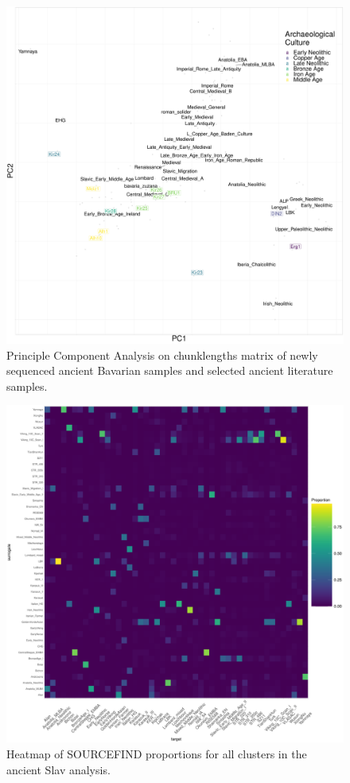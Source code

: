 \begin{figure}[htp]
    \centering
    \includegraphics[width=1.0\textwidth]{../images/appendix/chromopainter_PCA_ancients_Bavaria.pdf}
    \caption{Principle Component Analysis on chunklengths matrix of newly sequenced ancient Bavarian samples and selected ancient literature samples.}
    \label{fig:chromopainter_PCA_ancients_Bavaria}
\end{figure}

\begin{figure}[htp]
    \centering
    \includegraphics[width=1.0\textwidth]{../images/appendix/SF_heatmap_slavs.pdf}
    \caption{Heatmap of SOURCEFIND proportions for all clusters in the ancient Slav analysis.}
    \label{fig:SF_heatmap_slavs}
\end{figure}


